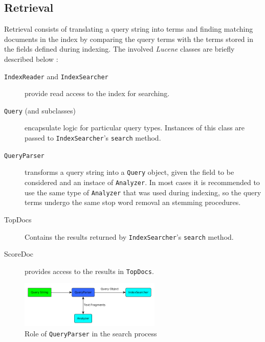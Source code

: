 \documentclass[a4paper]{usiinfbachelorproject}
\begin{document}
\newpage

\subsection{\textbf{Retrieval}} \label{sec:implRetrieval}

Retrieval consists of translating a query string into terms and finding matching documents in the index by comparing
the query terms with the terms stored in the fields defined during indexing. The involved \emph{Lucene} 
classes are briefly described below \cite{luceneInAction}:

\begin{description}

    \item[\texttt{IndexReader} and \texttt{IndexSearcher}] provide read access to the index for searching.

    \item[\texttt{Query} (and subclasses)] encapsulate logic for particular query types. Instances of this class
            are passed to \texttt{IndexSearcher}'s \texttt{search} method.

    \item[\texttt{QueryParser}] transforms a query string into a \texttt{Query} object, given the field to be considered
            and an instace of \texttt{Analyzer}. In most cases it is recommended to use the same type of \texttt{Analyzer}
            that was used during indexing, so the query terms undergo the same stop word removal an stemming procedures.

    \item[TopDocs] Contains the results returned by \texttt{IndexSearcher}'s \texttt{search} method.

    \item[ScoreDoc] provides access to the results in \texttt{TopDocs}.

\end{description}

\begin{figure}[h!]
\centering
\includegraphics[width=0.6\textwidth]{figures/queryParser}
\caption{Role of \texttt{QueryParser} in the search process \cite{luceneInAction}}
\label{fig:queryParser}
\end{figure}
\end{document}
